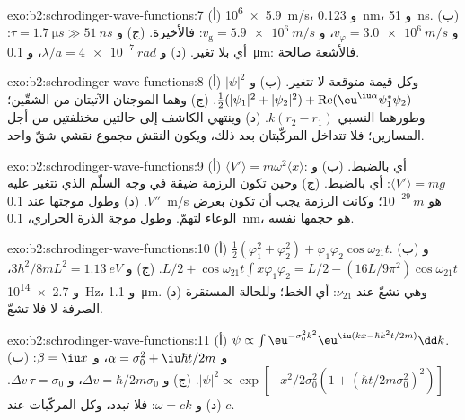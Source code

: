 \begin{solution}{exo:b2:schrodinger-wave-functions:7}
(أ) \qty{5.9e6}{m/s}، و \qty{0.123}{nm}، و \qty{51}{ns}. (ب) و $v_\varphi = \qty{3.0e6}{m/s}$،
و $v_{\text{g}} = \qty{5.9e6}{m/s}$: فالأخيرة. (ج) و $\tau = \qty{1.7}{\micro s} \gg
\qty{51}{ns}$: أي بلا تغير. (د) و $\lambda/a = \qty{4e-7}{rad}$، و \qty{0.1}{\micro m}:
فالأشعة صالحة.
\end{solution}

\begin{solution}{exo:b2:schrodinger-wave-functions:8}
(أ) $|\psi|^2$ وكل قيمة متوقعة لا تتغير. (ب) و $\tfrac12(|\psi_1|^2
+ |\psi_2|^2) + \operatorname{Re}(\eu^{\iu\alpha}\psi_1^*\psi_2)$. (ج) وهما الموجتان الآتيتان من
الشقّين؛ وطورهما النسبي $k(r_2 - r_1)$. (د) وينتهي الكاشف
إلى حالتين مختلفتين من أجل المسارين؛ فلا تتداخل المركّبتان
بعد ذلك، ويكون النقش مجموع نقشي شقّ
واحد.
\end{solution}

\begin{solution}{exo:b2:schrodinger-wave-functions:9}
(أ) $\langle V'\rangle = m\omega^2\langle x\rangle$: أي بالضبط. (ب) و $\langle V'\rangle
= mg$: أي بالضبط. (ج) وحين تكون الرزمة ضيقة في وجه السلّم الذي
تتغير عليه $V''$. (د) وطول موجتها عند \qty{0.1}{m/s} هو $10^{-29}\,\unit{m}$؛ وكانت
الرزمة يجب أن تكون بعرض الوعاء لتهمّ. وطول موجة الذرة
الحراري، \qty{0.1}{nm}، هو حجمها نفسه.
\end{solution}

\begin{solution}{exo:b2:schrodinger-wave-functions:10}
(أ) $\tfrac12(\varphi_1^2 + \varphi_2^2) + \varphi_1\varphi_2\cos\omega_{21}t$. (ب) و $L/2 +
\cos\omega_{21}t\int x\varphi_1\varphi_2 = L/2 - (16L/9\pi^2)\cos\omega_{21}t$. (ج)
و $3h^2/8mL^2 = \qty{1.13}{eV}$، و \qty{2.7e14}{Hz}، و \qty{1.1}{\micro m}. (د) وهي تشعّ
عند $\nu_{21}$: أي الخط؛ وللحالة المستقرة الصرفة لا  فلا تشعّ.
\end{solution}

\begin{solution}{exo:b2:schrodinger-wave-functions:11}
(أ) $\psi \propto \int\eu^{-\sigma_0^2k^2}\eu^{\iu(kx - \hbar k^2t/2m)}\dd k$. (ب) و $\alpha =
\sigma_0^2 + \iu\hbar t/2m$، و $\beta = \iu x$: $|\psi|^2 \propto \exp[-x^2/2\sigma_0^2(1 +
(\hbar t/2m\sigma_0^2)^2)]$. (ج) و $\Delta v = \hbar/2m\sigma_0$، و $\Delta v\,\tau =
\sigma_0$. (د) و $\omega = ck$: فلا تبدد، وكل المركّبات عند $c$.
\end{solution}

